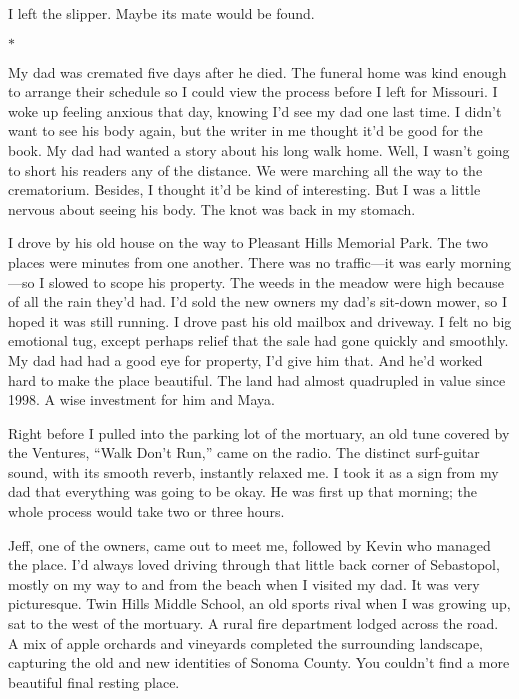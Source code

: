 \documentclass[12pt]{book}
\begin{document}
I left the slipper. Maybe its mate would be found.

\begin{center}$*$\end{center}

My dad was cremated five days after he died. The funeral home was kind enough to arrange their schedule so I could view the process before I left for Missouri. I woke up feeling anxious that day, knowing I'd see my dad one last time. I didn't want to see his body again, but the writer in me thought it'd be good for the book. My dad had wanted a story about his long walk home. Well, I wasn't going to short his readers any of the distance. We were marching all the way to the crematorium. Besides, I thought it'd be kind of interesting. But I was a little nervous about seeing his body. The knot was back in my stomach.

I drove by his old house on the way to Pleasant Hills Memorial Park. The two places were minutes from one another. There was no traffic---it was early morning---so I slowed to scope his property. The weeds in the meadow were high because of all the rain they'd had. I'd sold the new owners my dad's sit-down mower, so I hoped it was still running. I drove past his old mailbox and driveway. I felt no big emotional tug, except perhaps relief that the sale had gone quickly and smoothly. My dad had had a good eye for property, I'd give him that. And he'd worked hard to make the place beautiful. The land had almost quadrupled in value since 1998. A wise investment for him and Maya.

Right before I pulled into the parking lot of the mortuary, an old tune covered by the Ventures, ``Walk Don't Run,'' came on the radio. The distinct surf-guitar sound, with its smooth reverb, instantly relaxed me. I took it as a sign from my dad that everything was going to be okay. He was first up that morning; the whole process would take two or three hours.

Jeff, one of the owners, came out to meet me, followed by Kevin who managed the place. I'd always loved driving through that little back corner of Sebastopol, mostly on my way to and from the beach when I visited my dad. It was very picturesque. Twin Hills Middle School, an old sports rival when I was growing up, sat to the west of the mortuary. A rural fire department lodged across the road. A mix of apple orchards and vineyards completed the surrounding landscape, capturing the old and new identities of Sonoma County. You couldn't find a more beautiful final resting place.
\end{document}
